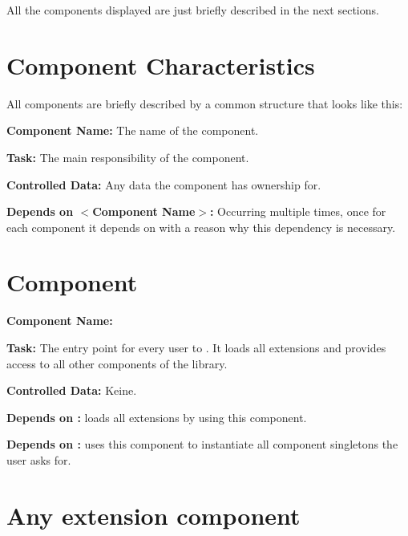 All the components displayed are just briefly described in the next sections.


\section{Component Characteristics}
\label{sec:StructureofaComponentDescription}

All components are briefly described by a common structure that looks like this:

\textbf{Component Name:} The name of the component.

\textbf{Task:} The main responsibility of the component.

\textbf{Controlled Data:} Any data the component has ownership for.

\textbf{Depends on $<$Component Name$>$:} Occurring multiple times, once for each component it depends on with a reason why this dependency is necessary.


\section{Component \COMPcontext{}}
\label{sec:COMPContext}

\textbf{Component Name:} \COMPcontext{}

\textbf{Task:} The entry point for every user to \LibName{}. It loads all extensions and provides access to all other components of the library.

\textbf{Controlled Data:} Keine.

\textbf{Depends on \COMPextensionManagement{}:} \COMPcontext{} loads all extensions by using this component.

\textbf{Depends on \COMPcomponentRegistry{}:} \COMPcontext{} uses this component to instantiate all component singletons the user asks for.


\section{Any extension component}
\label{sec:ExtComp}

